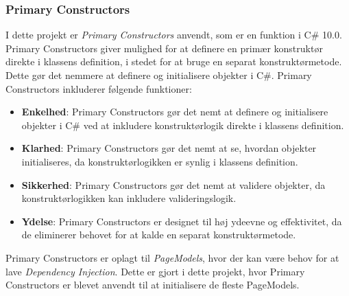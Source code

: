 \subsubsection{Primary Constructors}
I dette projekt er \emph{Primary Constructors} anvendt, som er en funktion i C\# 10.0. Primary Constructors giver mulighed for at definere en primær konstruktør direkte i klassens definition, i stedet for at bruge en separat konstruktørmetode. Dette gør det nemmere at definere og initialisere objekter i C\#. Primary Constructors inkluderer følgende funktioner:
\begin{itemize}
\item \textbf{Enkelhed}: Primary Constructors gør det nemt at definere og initialisere objekter i C\# ved at inkludere konstruktørlogik direkte i klassens definition.
\item \textbf{Klarhed}: Primary Constructors gør det nemt at se, hvordan objekter initialiseres, da konstruktørlogikken er synlig i klassens definition.
\item \textbf{Sikkerhed}: Primary Constructors gør det nemt at validere objekter, da konstruktørlogikken kan inkludere valideringslogik.
\item \textbf{Ydelse}: Primary Constructors er designet til høj ydeevne og effektivitet, da de eliminerer behovet for at kalde en separat konstruktørmetode.
\end{itemize}
Primary Constructors er oplagt til \emph{PageModels}, hvor der kan være behov for at lave \emph{Dependency Injection}. Dette er gjort i dette projekt, hvor Primary Constructors er blevet anvendt til at initialisere de fleste PageModels.

